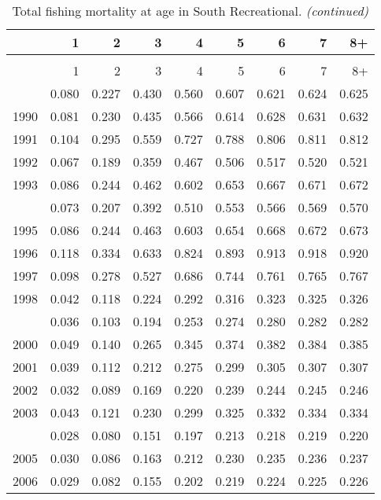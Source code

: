 \documentclass[
]{article}
\begin{document}
\begin{longtable}[t]{lrrrrrrrr}
\caption{\label{tab:South_Recreational-fleet-FAA-table}Total fishing mortality at age in South Recreational.}\\
\toprule
  & 1 & 2 & 3 & 4 & 5 & 6 & 7 & 8+\\
\midrule
\endfirsthead
\caption[]{Total fishing mortality at age in South Recreational. \textit{(continued)}}\\
\toprule
  & 1 & 2 & 3 & 4 & 5 & 6 & 7 & 8+\\
\midrule
\endhead

\endfoot
\bottomrule
\endlastfoot
1989 & 0.080 & 0.227 & 0.430 & 0.560 & 0.607 & 0.621 & 0.624 & 0.625\\
1990 & 0.081 & 0.230 & 0.435 & 0.566 & 0.614 & 0.628 & 0.631 & 0.632\\
1991 & 0.104 & 0.295 & 0.559 & 0.727 & 0.788 & 0.806 & 0.811 & 0.812\\
1992 & 0.067 & 0.189 & 0.359 & 0.467 & 0.506 & 0.517 & 0.520 & 0.521\\
1993 & 0.086 & 0.244 & 0.462 & 0.602 & 0.653 & 0.667 & 0.671 & 0.672\\
\addlinespace
1994 & 0.073 & 0.207 & 0.392 & 0.510 & 0.553 & 0.566 & 0.569 & 0.570\\
1995 & 0.086 & 0.244 & 0.463 & 0.603 & 0.654 & 0.668 & 0.672 & 0.673\\
1996 & 0.118 & 0.334 & 0.633 & 0.824 & 0.893 & 0.913 & 0.918 & 0.920\\
1997 & 0.098 & 0.278 & 0.527 & 0.686 & 0.744 & 0.761 & 0.765 & 0.767\\
1998 & 0.042 & 0.118 & 0.224 & 0.292 & 0.316 & 0.323 & 0.325 & 0.326\\
\addlinespace
1999 & 0.036 & 0.103 & 0.194 & 0.253 & 0.274 & 0.280 & 0.282 & 0.282\\
2000 & 0.049 & 0.140 & 0.265 & 0.345 & 0.374 & 0.382 & 0.384 & 0.385\\
2001 & 0.039 & 0.112 & 0.212 & 0.275 & 0.299 & 0.305 & 0.307 & 0.307\\
2002 & 0.032 & 0.089 & 0.169 & 0.220 & 0.239 & 0.244 & 0.245 & 0.246\\
2003 & 0.043 & 0.121 & 0.230 & 0.299 & 0.325 & 0.332 & 0.334 & 0.334\\
\addlinespace
2004 & 0.028 & 0.080 & 0.151 & 0.197 & 0.213 & 0.218 & 0.219 & 0.220\\
2005 & 0.030 & 0.086 & 0.163 & 0.212 & 0.230 & 0.235 & 0.236 & 0.237\\
2006 & 0.029 & 0.082 & 0.155 & 0.202 & 0.219 & 0.224 & 0.225 & 0.226\\

\end{longtable}
\end{document}

